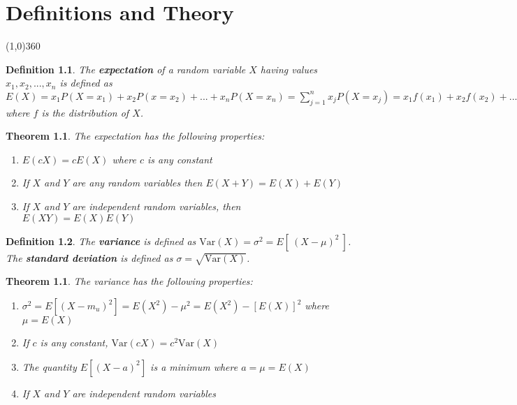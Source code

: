 \documentclass[12pt,twoside]{report}
\newtheorem{defn}{Definition}
\newtheorem{thm}[subsection]{Theorem}
\begin{document}
\tableofcontents
\newpage
{}

\chapter{Definitions and Theory}
\line(1,0){360} \\

\begin{defn}
    The \textbf{expectation} of a random variable $X$ having values $x_1, x_2, ..., x_n$ is defined as $E\left (X\right ) = x_1  P\left (X = x_1\right ) + x_2 P\left (x = x_2\right ) + ... + x_n P\left (X = x_n\right ) =  \sum_{j = 1}^n x_j P\left (X = x_j\right ) = x_1 f\left (x_1\right ) + x_2 f\left (x_2\right ) + ... + x_n f\left (x_n\right ) = \sum_{j=1} \to n x_j f\left (x_j\right )$ where $f$ is the distribution of $X$.
\end{defn}


\begin{samepage}
\begin{thm}  
    The expectation has the following properties:

    \begin{enumerate}
        \item $E(c X) = c E(X)$ where $c$ is any constant
        \item If $X$ and $Y$ are any random variables then $E(X + Y) = E(X) + E(Y)$
        \item If $X$ and $Y$ are independent random variables, then $E(XY) = E(X)E(Y)$
    \end{enumerate}
\end{thm}
\end{samepage}

\begin{defn}
    The \textbf{variance} is defined as $\text{Var} (X) = \sigma ^2 = E[ \  (X - \mu)^2 \  ]$.
    The \textbf{standard deviation} is defined as $\sigma = \sqrt{\text{Var} (X)}$.
\end{defn}

\begin{samepage}
\begin{thm}
    The variance has the following properties:

    \begin{enumerate}
        \item $\sigma ^2 = E\left [ \left (X - m_u\right ) ^2 \right ] = E\left (X ^2\right ) - \mu ^2 = E\left (X ^2\right ) - \left [E\left (X\right )\right ] ^2$ where $\mu = E\left (X\right )$
        \item If $c$ is any constant, $\text{Var}(cX) = c^2 \text{Var}(X)$
        \item The quantity $E[ (X - a)^2 ]$ is a minimum where $a = \mu = E(X)$
        \item If $X$ and $Y$ are independent random variables
    \end{enumerate}
\end{thm}
\end{samepage}
\end{document}
